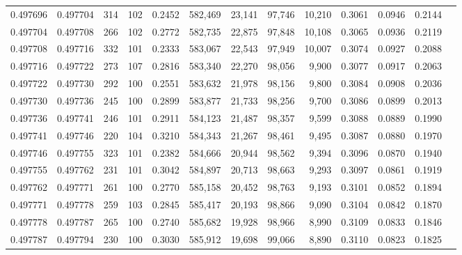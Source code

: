 \begin{tabular}{rrrrrrrrrrrrr}
0.497696 & 0.497704 &   314 & 102 &                                     0.2452 & 582,469 &  23,141 &  97,746 &  10,210 & 0.3061 & 0.0946 & 0.2144 \\
0.497704 & 0.497708 &   266 & 102 &                                     0.2772 & 582,735 &  22,875 &  97,848 &  10,108 & 0.3065 & 0.0936 & 0.2119 \\
0.497708 & 0.497716 &   332 & 101 &                                     0.2333 & 583,067 &  22,543 &  97,949 &  10,007 & 0.3074 & 0.0927 & 0.2088 \\
0.497716 & 0.497722 &   273 & 107 &                                     0.2816 & 583,340 &  22,270 &  98,056 &   9,900 & 0.3077 & 0.0917 & 0.2063 \\
0.497722 & 0.497730 &   292 & 100 &                                     0.2551 & 583,632 &  21,978 &  98,156 &   9,800 & 0.3084 & 0.0908 & 0.2036 \\
0.497730 & 0.497736 &   245 & 100 &                                     0.2899 & 583,877 &  21,733 &  98,256 &   9,700 & 0.3086 & 0.0899 & 0.2013 \\
0.497736 & 0.497741 &   246 & 101 &                                     0.2911 & 584,123 &  21,487 &  98,357 &   9,599 & 0.3088 & 0.0889 & 0.1990 \\
0.497741 & 0.497746 &   220 & 104 &                                     0.3210 & 584,343 &  21,267 &  98,461 &   9,495 & 0.3087 & 0.0880 & 0.1970 \\
0.497746 & 0.497755 &   323 & 101 &                                     0.2382 & 584,666 &  20,944 &  98,562 &   9,394 & 0.3096 & 0.0870 & 0.1940 \\
0.497755 & 0.497762 &   231 & 101 &                                     0.3042 & 584,897 &  20,713 &  98,663 &   9,293 & 0.3097 & 0.0861 & 0.1919 \\
0.497762 & 0.497771 &   261 & 100 &                                     0.2770 & 585,158 &  20,452 &  98,763 &   9,193 & 0.3101 & 0.0852 & 0.1894 \\
0.497771 & 0.497778 &   259 & 103 &                                     0.2845 & 585,417 &  20,193 &  98,866 &   9,090 & 0.3104 & 0.0842 & 0.1870 \\
0.497778 & 0.497787 &   265 & 100 &                                     0.2740 & 585,682 &  19,928 &  98,966 &   8,990 & 0.3109 & 0.0833 & 0.1846 \\
0.497787 & 0.497794 &   230 & 100 &                                     0.3030 & 585,912 &  19,698 &  99,066 &   8,890 & 0.3110 & 0.0823 & 0.1825 \\

\end{tabular}

